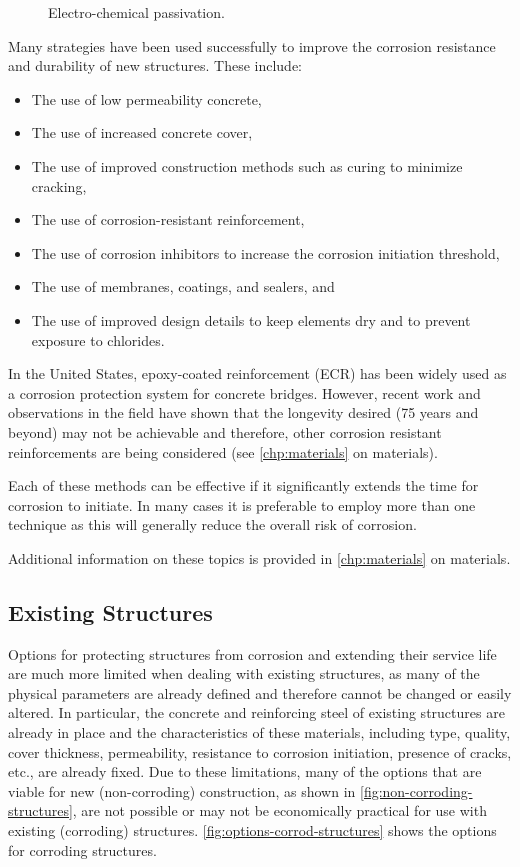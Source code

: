 \begin{figure}
  \caption{Electro-chemical passivation.}
  \label{fig:electro-chemical-passivation}
\end{figure}

Many strategies have been used successfully to improve the corrosion resistance and durability of new structures. These include:
\begin{itemize}
  \item The use of low permeability concrete,
  \item The use of increased concrete cover,
  \item The use of improved construction methods such as curing to minimize cracking,
  \item The use of corrosion-resistant reinforcement,
  \item The use of corrosion inhibitors to increase the corrosion initiation threshold,
  \item The use of membranes, coatings, and sealers, and
  \item The use of improved design details to keep elements dry and to prevent exposure to chlorides.
\end{itemize}

In the United States, epoxy-coated reinforcement (ECR) has been widely used as a corrosion protection system for concrete bridges. However, recent work and observations in the field have shown that the longevity desired (75 years and beyond) may not be achievable and therefore, other corrosion resistant reinforcements are being considered (see \cref{chp:materials} on materials).

Each of these methods can be effective if it significantly extends the time for corrosion to initiate. In many cases it is preferable to employ more than one technique as this will generally reduce the overall risk of corrosion.

Additional information on these topics is provided in \cref{chp:materials} on materials.

\subsection{Existing Structures}
Options for protecting structures from corrosion and extending their service life are much more limited when
dealing with existing structures, as many of the physical parameters are already defined and therefore cannot be
changed or easily altered. In particular, the concrete and reinforcing steel of existing structures are already in place and the characteristics of these materials, including type, quality, cover thickness, permeability, resistance to
corrosion initiation, presence of cracks, etc., are already fixed. Due to these limitations, many of the options that are
viable for new (non-corroding) construction, as shown in \cref{fig:non-corroding-structures}, are not possible or may not be economically
practical for use with existing (corroding) structures. \cref{fig:options-corrod-structures} shows the options for corroding structures.

